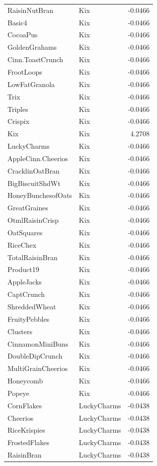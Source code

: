 \begin{longtable}{llr}
RaisinNutBran & Kix & -0.0466 \\
Basic4 & Kix & -0.0466 \\
CocoaPus & Kix & -0.0466 \\
GoldenGrahams & Kix & -0.0466 \\
Cinn.ToastCrunch & Kix & -0.0466 \\
FrootLoops & Kix & -0.0466 \\
LowFatGranola & Kix & -0.0466 \\
Trix & Kix & -0.0466 \\
Triples & Kix & -0.0466 \\
Crispix & Kix & -0.0466 \\
Kix & Kix & 4.2708 \\
LuckyCharms & Kix & -0.0466 \\
AppleCinn.Cheerios & Kix & -0.0466 \\
CracklinOatBran & Kix & -0.0466 \\
BigBiscuitShdWt & Kix & -0.0466 \\
HoneyBunchesofOats & Kix & -0.0466 \\
GreatGraines & Kix & -0.0466 \\
OtmlRaisinCrisp & Kix & -0.0466 \\
OatSquares & Kix & -0.0466 \\
RiceChex & Kix & -0.0466 \\
TotalRaisinBran & Kix & -0.0466 \\
Product19 & Kix & -0.0466 \\
AppleJacks & Kix & -0.0466 \\
CaptCrunch & Kix & -0.0466 \\
ShreddedWheat & Kix & -0.0466 \\
FruityPebbles & Kix & -0.0466 \\
Clusters & Kix & -0.0466 \\
CinnamonMiniBuns & Kix & -0.0466 \\
DoubleDipCrunch & Kix & -0.0466 \\
MultiGrainCheerios & Kix & -0.0466 \\
Honeycomb & Kix & -0.0466 \\
Popeye & Kix & -0.0466 \\
CornFlakes & LuckyCharms & -0.0438 \\
Cheerios & LuckyCharms & -0.0438 \\
RiceKrispies & LuckyCharms & -0.0438 \\
FrostedFlakes & LuckyCharms & -0.0438 \\
RaisinBran & LuckyCharms & -0.0438 \\

\end{longtable}
